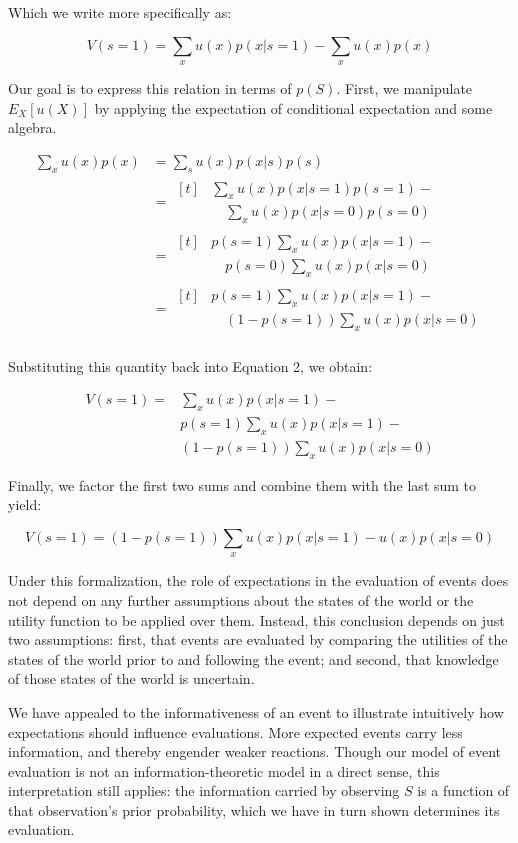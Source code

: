 \documentclass[9pt,twocolumn,twoside,]{pnas-new}
\begin{document}
{Which we write more specifically as:

\begin{equation}
V(s=1) = \sum_x u(x)p(x|s=1) - \sum_x u(x)p(x)
\end{equation}

Our goal is to express this relation in terms of \(p(S)\). First, we
manipulate \(E_X[u(X)]\) by applying the expectation of conditional
expectation and some algebra.

\begin{align*}
\sum_x u(x)p(x) & = \sum_s u(x)p(x|s)p(s) \\
 &= \begin{aligned}[t]
    & \sum_x u(x)p(x|s=1)p(s=1) - \\
    & \quad \sum_x u(x)p(x|s=0)p(s=0) \end{aligned}\\
 &= \begin{aligned}[t]
    & p(s=1)\sum_x u(x)p(x|s=1) -\\
    & \quad p(s=0) \sum_x u(x)p(x|s=0) \end{aligned}\\
 &= \begin{aligned}[t]
    & p(s=1)\sum_x u(x)p(x|s=1) - \\
    & \quad (1-p(s=1)) \sum_x u(x)p(x|s=0) \end{aligned}\\
\end{align*}

Substituting this quantity back into Equation 2, we obtain:

\begin{align*}
V(s=1) = & \sum_x u(x)p(x|s=1) - \\ & p(s=1)\sum_x u(x)p(x|s=1) -\\ & (1-p(s=1)) \sum_x u(x)p(x|s=0)
\end{align*}

Finally, we factor the first two sums and combine them with the last sum
to yield:

\begin{equation}
V(s=1)=(1-p(s=1))\sum_x u(x)p(x|s=1) - u(x)p(x|s=0)
\end{equation}

Under this formalization, the role of expectations in the evaluation of
events does not depend on any further assumptions about the states of
the world or the utility function to be applied over them. Instead, this
conclusion depends on just two assumptions: first, that events are
evaluated by comparing the utilities of the states of the world prior to
and following the event; and second, that knowledge of those states of
the world is uncertain.

We have appealed to the informativeness of an event to illustrate
intuitively how expectations should influence evaluations. More expected
events carry less information, and thereby engender weaker reactions.
Though our model of event evaluation is not an information-theoretic
model in a direct sense, this interpretation still applies: the
information carried by observing \(S\) is a function of that
observation's prior probability, which we have in turn shown determines
its evaluation.
}
\showmatmethods
\showacknow
\pnasbreak
\end{document}

